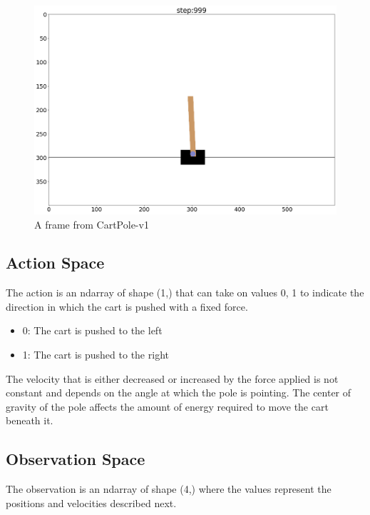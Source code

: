 \documentclass{article} %
\begin{document}
\begin{figure}[h]
    \begin{center}
        \includegraphics[width=\textwidth]{cartpole.png}
    \end{center}
    \caption{A frame from CartPole-v1}
    \label{fig:cartpole-rendering}
\end{figure}

\subsection{Action Space}
The action is an ndarray of shape (1,) that can take on values {0, 1} to indicate the
direction in which the cart is pushed with a fixed force.

\begin{itemize}
    \item 0: The cart is pushed to the left
    \item 1: The cart is pushed to the right
\end{itemize}

The velocity that is either decreased or increased by the force applied is not constant
and depends on the angle at which the pole is pointing. The center of gravity of the pole
affects the amount of energy required to move the cart beneath it.

\subsection{Observation Space}

The observation is an ndarray of shape (4,) where the values represent the positions and
velocities described next.
\end{document}
